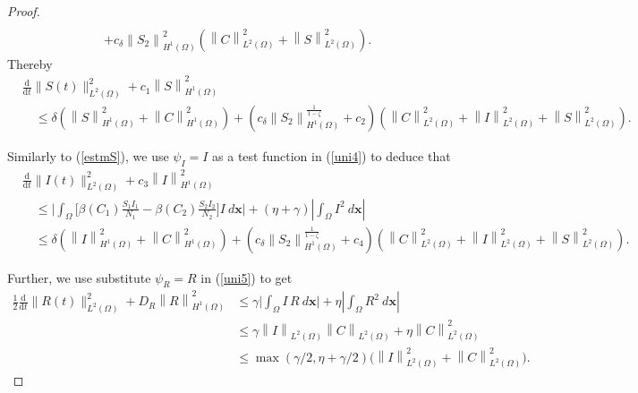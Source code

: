 \documentclass[10pt,number,preprint,times]{elsarticle}
\numberwithin{equation}{section} %
\begin{document}
\begin{proof}
\begin{equation*}
\begin{split}
				\\&+c_{\delta}\left\|S_2\right\|_{H^{1}(\Omega)}^{2}\left( \left\|C\right\|_{L^{2}(\Omega)}^2+\left\|S\right\|_{L^{2}(\Omega)}^2\right). 
			\end{split}
		\end{equation*}
		Thereby
		\begin{equation}\label{estmS}
			\begin{split}
				&\frac{\mathrm{d}}{\mathrm{d} t}\|S(t)\|_{L^2(\Omega)}^{2}+c_1\left\|S\right\|_{H^{1}(\Omega)}^{2}\\
				&\quad\leq \delta \left(\left\|S\right\|_{H^{1}(\Omega)}^2+\left\|C\right\|_{H^{1}(\Omega)}^2\right)+\left(c_{\delta}\left\|S_2\right\|_{H^{1}(\Omega)}^{\frac{1}{1-\zeta}}+c_2\right)\left( \left\|C\right\|_{L^{2}(\Omega)}^2+\left\|I\right\|_{L^{2}(\Omega)}^2+\left\|S\right\|_{L^{2}(\Omega)}^2\right). 
			\end{split}
		\end{equation}
		
		
		\noindent Similarly to (\ref{estmS}),  we use $\psi_I=I$ as a test function in (\ref{uni4}) to deduce that   
		\begin{equation}\label{estmI}
			\begin{split}
				&\displaystyle \frac{\mathrm{d}}{\mathrm{d} t}\|I(t)\|_{L^2(\Omega)}^{2}+c_3\left\|I\right\|_{H^{1}(\Omega)}^{2}
				\\
				&\quad\leq  \Big|\int_{\Omega}\Big[\beta(C_1)\frac{S_1 I_1}{N_1}-\beta(C_2)\frac{S_2 I_2}{N_2}\Big] I~d{\mathbf{x}}\Big| +(\eta+\gamma)\left|\int_{\Omega} I^2~d{\mathbf{x}} \right|
				\\
				&\quad\leq \delta \left(\left\|I\right\|_{H^{1}(\Omega)}^2+\left\|C\right\|_{H^{1}(\Omega)}^2\right)+\left(c_{\delta}\left\|S_2\right\|_{H^{1}(\Omega)}^{\frac{1}{1-\zeta}}+c_4\right)
				\left( \left\|C\right\|_{L^{2}(\Omega)}^2+\left\|I\right\|_{L^{2}(\Omega)}^2+\left\|S\right\|_{L^{2}(\Omega)}^2\right) 
				.
			\end{split}
		\end{equation}
		
		
		\noindent Further, we use substitute $\psi_R=R$ in (\ref{uni5}) to get   
		\begin{equation}\label{estmR}
			\begin{split}
				\displaystyle \frac{1}{2}\frac{\mathrm{d}}{\mathrm{d} t}\|R(t)\|_{L^2(\Omega)}^{2}+D_R\left\|R\right\|_{H^{1}(\Omega)}^{2}&\leq  \gamma \Big|\int_{\Omega}I\, R~d{\mathbf{x}}\Big| +\eta\left|\int_{\Omega} R^2~d{\mathbf{x}} \right|
				\\&\leq\gamma\left\|I\right\|_{L^{2}(\Omega)}\left\|C\right\|_{L^{2}(\Omega)}+\eta \left\|C\right\|_{L^{2}(\Omega)}^{2}
				\\&\leq\max(\gamma/2,\eta+\gamma/2)\Big(\left\|I\right\|_{L^{2}(\Omega)}^2+ \left\|C\right\|_{L^{2}(\Omega)}^{2}\Big)
				.
			\end{split}
		\end{equation}
		

\end{proof}
\end{document}

